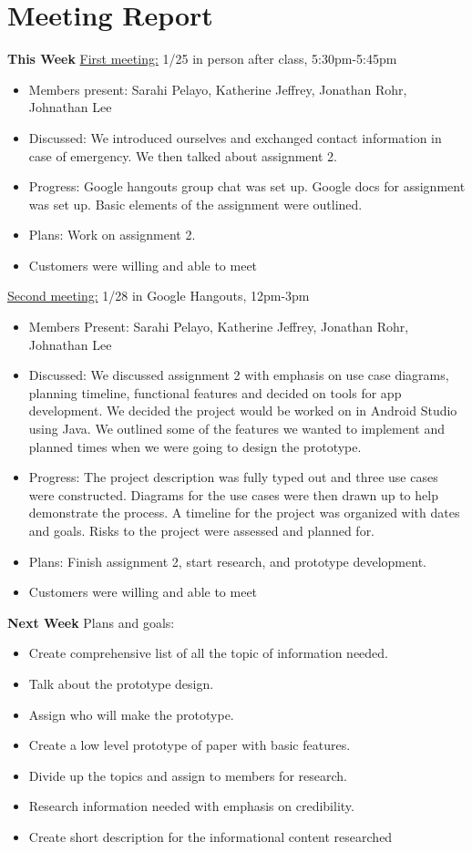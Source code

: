 \documentclass[letterpaper,12pt,titlepage]{article}
\begin{document}
\section{Meeting Report}
\textbf{This Week}
\newline
\newline
\underline{First meeting:} 1/25 in person after class, 5:30pm-5:45pm
\begin{itemize}
\item Members present: Sarahi Pelayo, Katherine Jeffrey, Jonathan Rohr, Johnathan Lee
\item Discussed: We introduced ourselves and exchanged contact information in case of emergency. We then talked about assignment 2.
\item Progress: Google hangouts group chat was set up. Google docs for assignment was set up. Basic elements of the assignment were outlined.
\item Plans: Work on assignment 2.
\item Customers were willing and able to meet 
\end{itemize}
\noindent
\underline{Second meeting:} 1/28 in Google Hangouts, 12pm-3pm
\begin{itemize}
\item Members Present: Sarahi Pelayo, Katherine Jeffrey, Jonathan Rohr, Johnathan Lee
\item Discussed: We discussed assignment 2 with emphasis on use case diagrams, planning timeline, functional features and decided on tools for app development. We decided the project would be worked on in Android Studio using Java. We outlined some of the features we wanted to implement and planned times when we were going to design the prototype.
\item Progress: The project description was fully typed out and three use cases were constructed. Diagrams for the use cases were then drawn up to help demonstrate the process. A timeline for the project was organized with dates and goals. Risks to the project were assessed and planned for. 
\item Plans: Finish assignment 2, start research, and prototype development.
\item Customers were willing and able to meet
\end{itemize}
\textbf{Next Week}
\newline
\newline
Plans and goals:
\begin{itemize}
\item Create comprehensive list of all the topic of information needed.
\item Talk about the prototype design. 
\item Assign who will make the prototype.
\item Create a low level prototype of paper with basic features.
\item Divide up the topics and assign to members for research.
\item Research information needed with emphasis on credibility.
\item Create short description for the informational content researched
\end{itemize}



\end{document}
